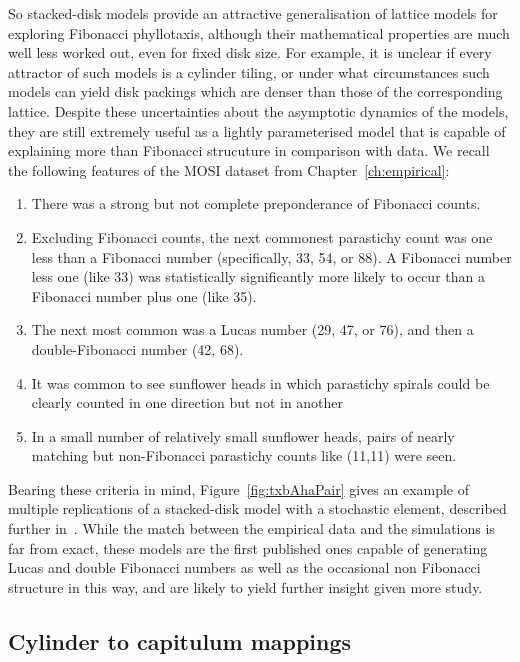 So stacked-disk models provide an attractive generalisation of lattice models for exploring Fibonacci phyllotaxis, although their mathematical properties are much well less worked out, even for fixed disk size.  For example,  it is unclear if every attractor of such models is a cylinder tiling, or under what circumstances
such models can yield disk packings which are denser than those of the corresponding lattice. Despite these uncertainties about the asymptotic dynamics of the models, they are still extremely useful as a lightly parameterised model that is capable of explaining more than Fibonacci strucuture in comparison with data.
We recall the following features of the MOSI dataset from Chapter~\ref{ch:empirical}:

\begin{enumerate}
	\item There was a strong but not complete preponderance of Fibonacci counts.
	\item	Excluding Fibonacci counts, the next commonest parastichy count was one less than a Fibonacci number (specifically, 33, 54, or 88).  A Fibonacci number less one (like 33) was statistically significantly more likely to occur than a Fibonacci number plus one (like 35).
	\item The next most common was a Lucas number (29, 47, or 76), and then a double-Fibonacci number (42, 68).
	\item It was common to see sunflower heads in which parastichy spirals could be clearly counted in one direction but not in another
	\item In a small number of relatively small sunflower heads, pairs of nearly matching but non-Fibonacci parastichy counts like (11,11)  were seen.
\end{enumerate}

Bearing these criteria in mind, Figure~\ref{fig:txbAhaPair} gives an example of multiple replications of a stacked-disk model with a stochastic element, described further in~\cite{swintonDiskstackingModelsAre2024}. While the match between the empirical data and the simulations is far from exact, these models are the first published ones capable of generating Lucas and double Fibonacci numbers as well as the occasional non Fibonacci structure in this way, and are likely to yield further insight given more study. 



\subsection{Cylinder to capitulum mappings}

